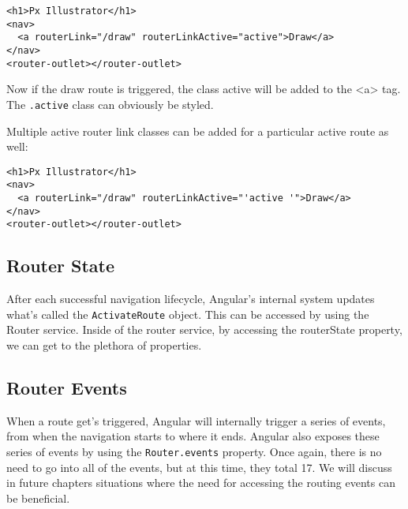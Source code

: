 \begin{lstlisting}
<h1>Px Illustrator</h1>
<nav>
  <a routerLink="/draw" routerLinkActive="active">Draw</a>
</nav>
<router-outlet></router-outlet>
\end{lstlisting}

Now if the draw route is triggered, the class active will 
be added to the <a> tag. The \lstinline{.active} class 
can obviously be styled.

Multiple active router link classes can be added for a 
particular active route as well: 

\begin{lstlisting}
<h1>Px Illustrator</h1>
<nav>
  <a routerLink="/draw" routerLinkActive="'active '">Draw</a>
</nav>
<router-outlet></router-outlet>
\end{lstlisting}

\subsection{ Router State }
After each successful navigation lifecycle, Angular's internal system 
updates what's called the \lstinline{ActivateRoute} object. This can be
accessed by using the Router service. Inside of the router service, by 
accessing the routerState property, we can get to the plethora of 
properties.
\\

\subsection{ Router Events }
When a route get's triggered, Angular will internally trigger a series 
of events, from when the navigation starts to where it ends. Angular 
also exposes these series of events by using the \lstinline{Router.events}
property. Once again, there is no need to go into all of the events, but 
at this time, they total 17. We will discuss in future chapters situations 
where the need for accessing the routing events can be beneficial. 

